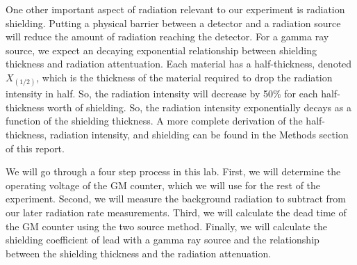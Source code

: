 \par One other important aspect of radiation relevant to our experiment is radiation shielding. Putting a physical barrier between a detector and a radiation source will reduce the amount of radiation reaching the detector. For a gamma ray source, we expect an decaying exponential relationship between shielding thickness and radiation attentuation. Each material has a half-thickness, denoted $X_(1/2)$, which is the thickness of the material required to drop the radiation intensity in half. So, the radiation intensity will decrease by 50\% for each half-thickness worth of shielding. So, the radiation intensity exponentially decays as a function of the shielding thickness. \cite{Spectrum}A more complete derivation of the half-thickness, radiation intensity, and shielding can be found in the Methods section of this report.

\par We will go through a four step process in this lab. First, we will determine the operating voltage of the GM counter, which we will use for the rest of the experiment. Second, we will measure the background radiation to subtract from our later radiation rate measurements. Third, we will calculate the dead time of the GM counter using the two source method. Finally, we will calculate the shielding coefficient of lead with a gamma ray source and the relationship between the shielding thickness and the radiation attenuation.

\begin{comment}
\par We expect the radiation attenuation to follow an exponential decay as a function of lead shielding thickness. The intensity (I) after passing through a lead shield of thickness X is given by the equation
\begin{equation}
I = I_0e^{-\mu X},
\end{equation}
where $I_0$ is the initial intensity and $\mu$ is the attenuation coefficient. To solve this equation for $\mu$, we set the final intensity equal to half the initial intensity, which will occur after a thickness $X_{1/2}$, the half thickness:
\begin{equation}
1/2 I = I_0e^{-\mu X_{1/2}}.
\end{equation}
Solving Equation (2) for $\mu$ gives
\begin{equation}
\mu = ln(2)/{X_{1/2}}.
\end{equation}
We will measure and calculate $\mu$ and $X_{1/2}$ for Cobalt-60 gamma radiation attenuation through lead, expecting an exponential relationship between the shielding thickness and the radiation attenuation\cite{Spectrum}. 
\end{comment}

